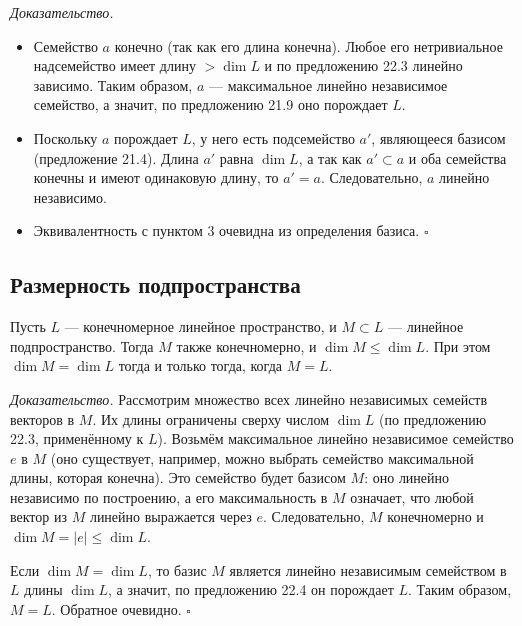 \documentclass[a4paper,12pt]{article}
\theoremstyle{definition}
\theoremstyle{plain}
\theoremstyle{remark}
\begin{document}
	\medskip
	\textit{Доказательство.}
	\begin{itemize}
		\item[1 \(\Rightarrow\) 2.] Семейство \( a \) конечно (так как его длина конечна). Любое его нетривиальное надсемейство имеет длину \( > \dim L \) и по предложению 22.3 линейно зависимо. Таким образом, \( a \) — максимальное линейно независимое семейство, а значит, по предложению 21.9 оно порождает \( L \).
		\item[2 \(\Rightarrow\) 1.] Поскольку \( a \) порождает \( L \), у него есть подсемейство \( a' \), являющееся базисом (предложение 21.4). Длина \( a' \) равна \( \dim L \), а так как \( a' \subset a \) и оба семейства конечны и имеют одинаковую длину, то \( a' = a \). Следовательно, \( a \) линейно независимо.
		\item Эквивалентность с пунктом 3 очевидна из определения базиса. \hfill \(\square\)
	\end{itemize}
	
	\subsection{Размерность подпространства}
	
	\begin{tcolorbox}[colback=red!5, colframe=red!50!black, title=Теорема]
		Пусть \( L \) — конечномерное линейное пространство, и \( M \subset L \) — линейное подпространство. Тогда \( M \) также конечномерно, и \( \dim M \leq \dim L \). При этом \( \dim M = \dim L \) тогда и только тогда, когда \( M = L \).
	\end{tcolorbox}
	
	\medskip
	\textit{Доказательство.}
	Рассмотрим множество всех линейно независимых семейств векторов в \( M \). Их длины ограничены сверху числом \( \dim L \) (по предложению 22.3, применённому к \( L \)). Возьмём максимальное линейно независимое семейство \( e \) в \( M \) (оно существует, например, можно выбрать семейство максимальной длины, которая конечна). Это семейство будет базисом \( M \): оно линейно независимо по построению, а его максимальность в \( M \) означает, что любой вектор из \( M \) линейно выражается через \( e \). Следовательно, \( M \) конечномерно и \( \dim M = |e| \leq \dim L \).
	
	Если \( \dim M = \dim L \), то базис \( M \) является линейно независимым семейством в \( L \) длины \( \dim L \), а значит, по предложению 22.4 он порождает \( L \). Таким образом, \( M = L \). Обратное очевидно. \hfill \(\square\)
	
\end{document}
